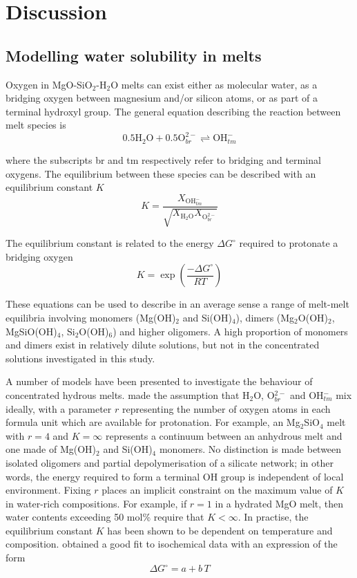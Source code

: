 \documentclass[review]{elsarticle}
\begin{document}
\section{Discussion}
\subsection{Modelling water solubility in melts}

Oxygen in MgO-SiO$_2$-H$_2$O melts can exist either as molecular water, as a bridging oxygen between magnesium and/or silicon atoms, or as part of a terminal hydroxyl group. The general equation describing the reaction between melt species is
\begin{equation}
0.5 \textrm{H}_2\textrm{O} + 0.5 \textrm{O}_{br}^{2-} \rightleftharpoons \textrm{OH}_{tm}^-
\label{eqn:speciation}
\end{equation}

where the subscripts br and tm respectively refer to bridging and terminal oxygens. The equilibrium between these species can be described with an equilibrium constant $K$ \cite[e.g.][]{Stolper1982}
\begin{equation}
K = \frac{X_{\textrm{OH}_{tm}^-}}{\sqrt{X_{\textrm{H}_2\textrm{O}} X_{\textrm{O}_{br}^{2-}} } }
\label{eqn:equilibrium_constant}
\end{equation}

The equilibrium constant is related to the energy $\Delta G^{\circ}$ required to protonate a bridging oxygen
\begin{equation}
K = \exp\left(\frac{-\Delta G^{\circ}}{RT}\right)
\end{equation}

These equations can be used to describe in an average sense a range of melt-melt equilibria involving monomers (Mg(OH)$_2$ and Si(OH)$_4$), dimers (Mg$_2$O(OH)$_2$, MgSiO(OH)$_4$, Si$_2$O(OH)$_6$) and higher oligomers. A high proportion of monomers and dimers exist in relatively dilute solutions, but not in the concentrated solutions investigated in this study.

A number of models have been presented to investigate the behaviour of concentrated hydrous melts. \cite{SS1985} made the assumption that H$_2$O, O$_{br}^{2-}$ and OH$_{tm}^-$ mix ideally, with a parameter $r$ representing the number of oxygen atoms in each formula unit which are available for protonation. For example, an Mg$_2$SiO$_4$ melt with $r=4$ and $K=\infty$ represents a continuum between an anhydrous melt and one made of Mg(OH)$_2$ and Si(OH)$_4$ monomers. No distinction is made between isolated oligomers and partial depolymerisation of a silicate network; in other words, the energy required to form a terminal OH group is independent of local environment. Fixing $r$ places an implicit constraint on the maximum value of $K$ in water-rich compositions. For example, if $r=1$ in a hydrated MgO melt, then water contents exceeding 50 mol\% require that $K<\infty$. In practise, the equilibrium constant $K$ has been shown to be dependent on temperature and composition. \cite{SK1995} obtained a good fit to isochemical data with an expression of the form
\begin{equation}
\Delta G^{\circ} = a + b\,T
\end{equation}
\end{document}
